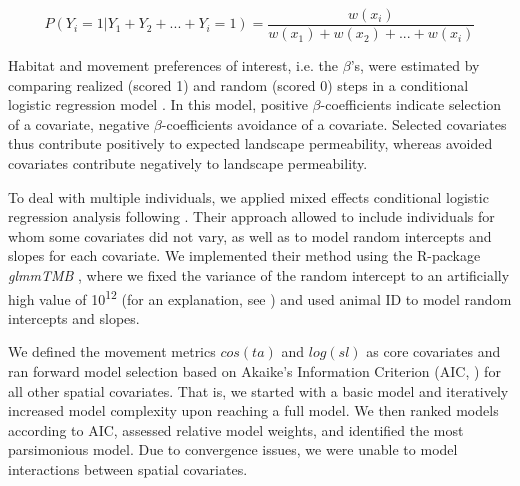 \documentclass[abstract=on,10pt,a4paper,bibliography=totocnumbered]{scrartcl}
\begin{document}
\begin{equation}
\label{EQ3}
  P(Y_{i} = 1 | Y_{1} + Y_{2} + ... + Y_{i} = 1) =
  \frac{w(x_{i})}{w(x_{1}) + w(x_{2}) + ... + w(x_{i})}
\end{equation}

\noindent Habitat and movement preferences of interest, i.e. the \(\beta\)'s,
were estimated by comparing realized (scored 1) and random (scored 0) steps in a
conditional logistic regression model \citep{Fortin.2005}. In this model,
positive \(\beta\)-coefficients indicate selection of a covariate, negative
\(\beta\)-coefficients avoidance of a covariate. Selected covariates thus
contribute positively to expected landscape permeability, whereas avoided
covariates contribute negatively to landscape permeability.

To deal with multiple individuals, we applied mixed effects conditional logistic
regression analysis following \cite{Muff.2019}. Their approach allowed to
include individuals for whom some covariates did not vary, as well as to model
random intercepts and slopes for each covariate. We implemented their method
using the R-package \textit{glmmTMB} \citep{Mollie.2017}, where we fixed the
variance of the random intercept to an artificially high value of
10\textsuperscript{12} (for an explanation, see \citealp{Muff.2019}) and used
animal ID to model random intercepts and slopes.

We defined the movement metrics \(cos(ta)\) and \(log(sl)\) as core covariates
and ran forward model selection based on Akaike's Information Criterion (AIC,
\citealp{Burnham.2002}) for all other spatial covariates. That is, we started
with a basic model and iteratively increased model complexity upon reaching a
full model. We then ranked models according to AIC, assessed relative model
weights, and identified the most parsimonious model. Due to convergence issues,
we were unable to model interactions between spatial covariates.
\end{document}

